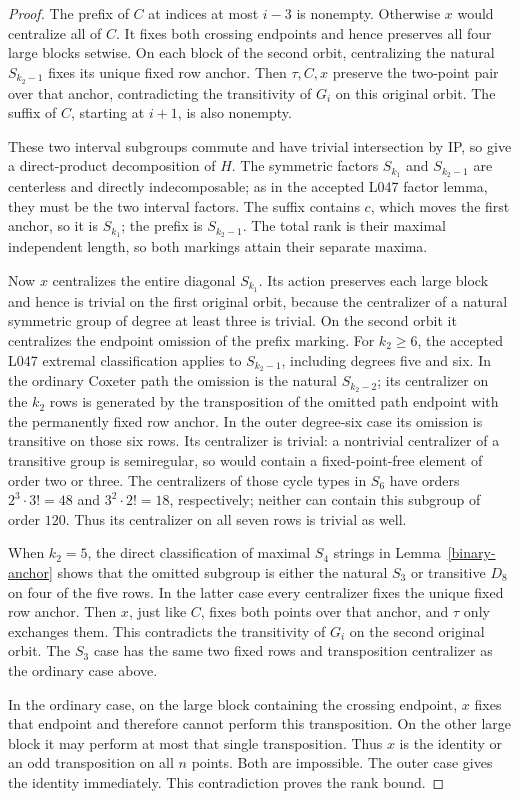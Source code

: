 \documentclass[11pt,a4paper]{article}
\begin{document}
\begin{proof}
The prefix of $C$ at indices at most $i-3$ is nonempty.
Otherwise $x$ would centralize all of $C$. It fixes both
crossing endpoints and hence preserves all four large blocks
setwise. On each block of the second orbit, centralizing the
natural $S_{k_2-1}$ fixes its unique fixed row anchor. Then
$\tau,C,x$ preserve the two-point pair over that anchor,
contradicting the transitivity of $G_i$ on this original orbit.
The suffix of $C$, starting at $i+1$, is also nonempty.

These two interval subgroups commute and have trivial
intersection by IP, so give a direct-product decomposition of
$H$. The symmetric factors $S_{k_1}$ and $S_{k_2-1}$ are
centerless and directly indecomposable; as in the accepted
L047 factor lemma, they must be the two interval factors.
The suffix contains $c$, which moves the first anchor, so it
is $S_{k_1}$; the prefix is $S_{k_2-1}$.
The total rank is their maximal independent length, so both
markings attain their separate maxima.

Now $x$ centralizes the entire diagonal $S_{k_1}$. Its action
preserves each large block and hence is trivial on the first
original orbit, because the centralizer of a natural symmetric
group of degree at least three is trivial. On the second orbit
it centralizes the endpoint omission of the prefix marking.
For $k_2\geq6$, the accepted L047 extremal classification applies to
$S_{k_2-1}$, including degrees five and six. In the ordinary
Coxeter path the omission is the natural $S_{k_2-2}$; its
centralizer on the $k_2$ rows is generated by the transposition
of the omitted path endpoint with the permanently fixed row
anchor. In the outer degree-six case its omission is transitive
on those six rows. Its centralizer is trivial: a nontrivial
centralizer of a transitive group is semiregular, so would
contain a fixed-point-free element of order two or three.
The centralizers of those cycle types in $S_6$ have orders
$2^3\cdot3!=48$ and $3^2\cdot2!=18$, respectively; neither
can contain this subgroup of order $120$. Thus its centralizer
on all seven rows is trivial as well.

When $k_2=5$, the direct classification of maximal $S_4$
strings in Lemma~\ref{binary-anchor} shows that the omitted
subgroup is either the natural $S_3$ or transitive $D_8$ on
four of the five rows. In the latter case every centralizer
fixes the unique fixed row anchor. Then $x$, just like $C$,
fixes both points over that anchor, and $\tau$ only exchanges
them. This contradicts the transitivity of $G_i$ on the second
original orbit. The $S_3$ case has the same two fixed rows
and transposition centralizer as the ordinary case above.

In the ordinary case, on the large block containing the
crossing endpoint, $x$ fixes that endpoint and therefore cannot
perform this transposition. On the other large block it may
perform at most that single transposition. Thus $x$ is the
identity or an odd transposition on all $n$ points. Both are
impossible. The outer case gives the identity immediately.
This contradiction proves the rank bound.
\end{proof}
\end{document}
